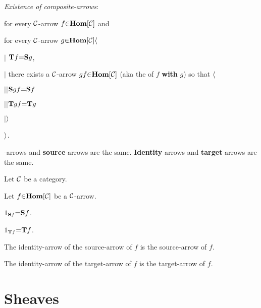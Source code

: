    {\it Existence of composite-arrows}: \par  %
    \hs\hs for every ${\cal C}$-arrow $f \p\in {\bf Hom}[{\cal C}]$ and \par
    \hs\hs for every ${\cal C}$-arrow $g \p\in {\bf Hom}[{\cal C}] \a\langle$ \par
    \hs\hs$|$\hs {} ${\bf T}f \p= {\bf S}g$, \par
    \hs\hs$|$\hs {} there exists a ${\cal C}$-arrow $gf \p\in {\bf Hom}[{\cal C}]$ (aka the  of $f$ {\bf with} $g$) so that $\a\langle$ \par
    \hs\hs$|$\hs$|$\hs ${\bf S}gf \p= {\bf S}f$  \par
    \hs\hs$|$\hs$|$\hs ${\bf T}gf \p= {\bf T}g$ \par
    \hs\hs$|$\hs $\a\rangle$ \par
    \hs\hs $\a\rangle$.

\vs
{}-arrows and {\bf source}-arrows are the same. {\bf Identity}-arrows and {\bf target}-arrows are the same. \par
Let ${\cal C}$ be a category. \par
Let $f \p\in {\bf Hom}[{\cal C}]$ be a ${\cal C}$-arrow. \par
      $1_{{\bf S}f} \p= {\bf S}f$. \par
      $1_{{\bf T}f} \p= {\bf T}f$. \par
   The identity-arrow of the source-arrow of $f$ is the source-arrow of $f$. \par
   The identity-arrow of the target-arrow of $f$ is the target-arrow of $f$. \par




\chapter{Sheaves}

